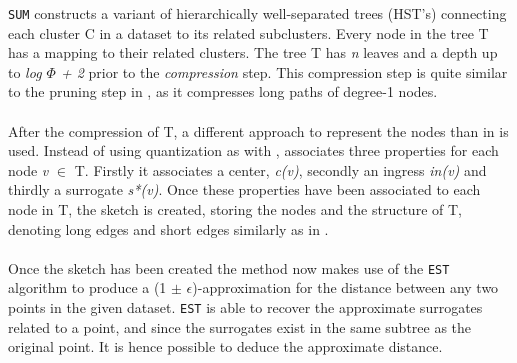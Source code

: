 \texttt{SUM} constructs a variant of hierarchically well-separated trees (HST's) connecting each cluster C in a dataset to its related subclusters. Every node in the tree T has a mapping to their related clusters. The tree T has \textit{n} leaves and a depth up to \textit{log $\Phi$ + 2} prior to the \textit{compression} step. This compression step is quite similar to the pruning step in \cite{wagner17}, as it compresses long paths of degree-1 nodes.
\\
\\
After the compression of T, a different approach to represent the nodes than in \cite{wagner17} is used. Instead of using quantization as with \qs{}, \cite{NearO} associates three properties for each node \textit{v} $\in$ T. Firstly it associates a center, \textit{c(v)}, secondly an ingress \textit{in(v)} and thirdly a surrogate \textit{s*(v)}. %
Once these properties have been associated to each node in T, the sketch is created, storing the nodes and the structure of T, denoting long edges and short edges similarly as in \qs{}. 
\\
\\
Once the sketch has been created the method now makes use of the \texttt{EST} algorithm to produce a (1 $\pm$ $\epsilon$)-approximation for the distance between any two points in the given dataset. \texttt{EST} is able to recover the approximate surrogates related to a point, and since the surrogates exist in the same subtree as the original point. It is hence possible to deduce the approximate distance. 
